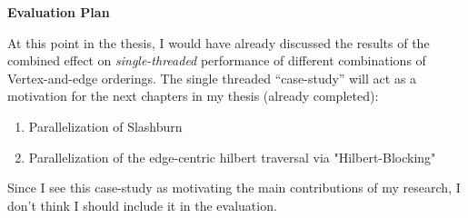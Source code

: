 

\textbf{Evaluation Plan}

At this point in the thesis, I would have already discussed the results of the combined effect on \textit{single-threaded} performance of different combinations of Vertex-and-edge orderings. The single threaded ``case-study'' will act as a motivation for the next chapters in my thesis (already completed):
    \begin{enumerate}
        \item Parallelization of Slashburn
        \item Parallelization of the edge-centric hilbert traversal via "Hilbert-Blocking"
    \end{enumerate} 

    Since I see this case-study as motivating the main contributions of my research, I don't think I should include it in the evaluation. \newline

    
    

